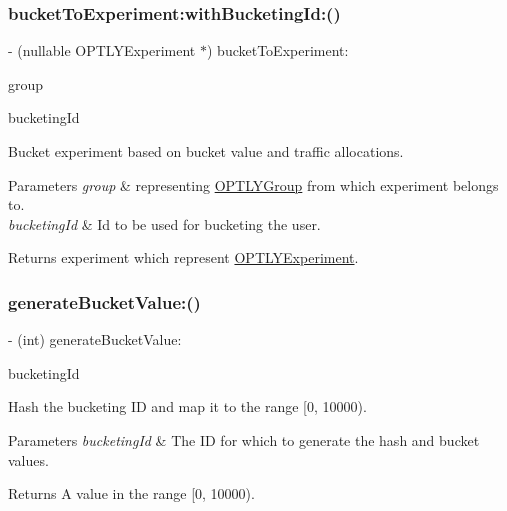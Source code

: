 \subsubsection{\texorpdfstring{bucket\+To\+Experiment\+:with\+Bucketing\+Id\+:()}{bucketToExperiment:withBucketingId:()}}
{\footnotesize\ttfamily -\/ (nullable O\+P\+T\+L\+Y\+Experiment $\ast$) bucket\+To\+Experiment\+: \begin{DoxyParamCaption}\item[{(nonnull O\+P\+T\+L\+Y\+Group $\ast$)}]{group }\item[{withBucketingId:(nonnull N\+S\+String $\ast$)}]{bucketing\+Id }\end{DoxyParamCaption}}

Bucket experiment based on bucket value and traffic allocations. 
\begin{DoxyParams}{Parameters}
{\em group} & representing \mbox{\hyperlink{protocol_o_p_t_l_y_group-p}{O\+P\+T\+L\+Y\+Group}} from which experiment belongs to. \\
\hline
{\em bucketing\+Id} & Id to be used for bucketing the user. \\
\hline
\end{DoxyParams}
\begin{DoxyReturn}{Returns}
experiment which represent \mbox{\hyperlink{protocol_o_p_t_l_y_experiment-p}{O\+P\+T\+L\+Y\+Experiment}}. 
\end{DoxyReturn}
\mbox{\label{interface_o_p_t_l_y_bucketer_a18416626947bc0b34c3a0e4a3f90bb87}} 
\subsubsection{\texorpdfstring{generate\+Bucket\+Value\+:()}{generateBucketValue:()}}
{\footnotesize\ttfamily -\/ (int) generate\+Bucket\+Value\+: \begin{DoxyParamCaption}\item[{(nonnull N\+S\+String $\ast$)}]{bucketing\+Id }\end{DoxyParamCaption}}

Hash the bucketing ID and map it to the range \mbox{[}0, 10000). 
\begin{DoxyParams}{Parameters}
{\em bucketing\+Id} & The ID for which to generate the hash and bucket values. \\
\hline
\end{DoxyParams}
\begin{DoxyReturn}{Returns}
A value in the range \mbox{[}0, 10000). 
\end{DoxyReturn}
\mbox{\label{interface_o_p_t_l_y_bucketer_a7bfb8596f8a8671c1df60e2b363ba783}} 
